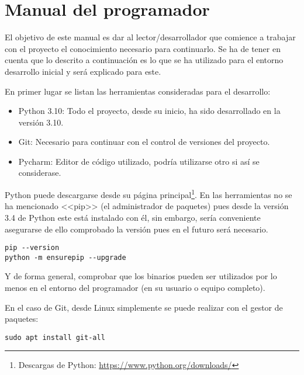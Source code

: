 \section{Manual del programador}
El objetivo de este manual es dar al lector/desarrollador que comience a
trabajar con el proyecto el conocimiento necesario para continuarlo. Se ha de
tener en cuenta que lo descrito a continuación es lo que se ha utilizado para el
entorno desarrollo inicial y será explicado para este.

En primer lugar se listan las herramientas consideradas para el desarrollo:
\begin{itemize}
    \item Python 3.10: Todo el proyecto, desde su inicio, ha sido desarrollado en la versión 3.10.
    \item Git: Necesario para continuar con el control de versiones del proyecto.
    \item Pycharm: Editor de código utilizado, podría utilizarse otro si así se considerase.
\end{itemize}

Python puede descargarse desde su página principal\footnote{Descargas de
Python: \url{https://www.python.org/downloads/}}. En las herramientas no se ha
mencionado <<pip>> (el administrador de paquetes) pues desde la versión 3.4 de
Python este está instalado con él, sin embargo, sería conveniente asegurarse de
ello comprobado la versión pues en el futuro será necesario. 

\begin{tcolorbox}[colback=cyan!5!white,colframe=cyan!75!black,title=Comprobar pip]
\begin{verbatim}
pip --version
python -m ensurepip --upgrade
\end{verbatim}
\end{tcolorbox}

Y de forma general, comprobar que los binarios pueden ser utilizados por lo
menos en el entorno del programador (en su usuario o equipo completo).

En el caso de Git, desde Linux simplemente se puede realizar con el gestor de
paquetes:

\begin{tcolorbox}[colback=cyan!5!white,colframe=cyan!75!black,title=Instalar Git en Linux]
\begin{verbatim}
sudo apt install git-all
\end{verbatim}
\end{tcolorbox}

